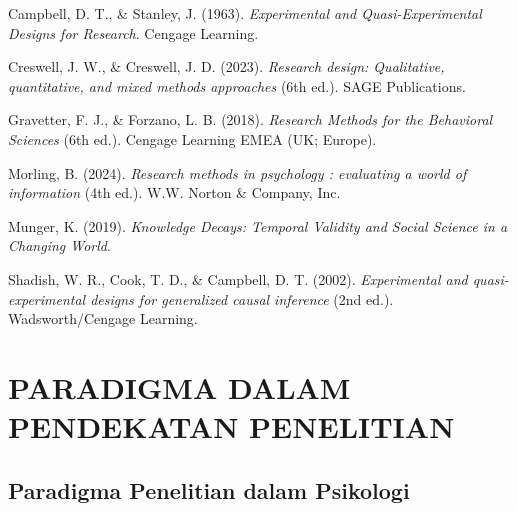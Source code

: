 \documentclass[
  indonesian,
  letterpaper,
  DIV=11,
  numbers=noendperiod]{scrreprt}
\newlength{\cslhangindent}
\newenvironment{CSLReferences}[2] %
 {\begin{list}{}{%
  \setlength{\itemindent}{0pt}
  \setlength{\leftmargin}{0pt}
  \setlength{\parsep}{0pt}
  \ifodd #1
   \setlength{\leftmargin}{\cslhangindent}
   \setlength{\itemindent}{-1\cslhangindent}
  \fi
  \setlength{\itemsep}{#2\baselineskip}}}
 {\end{list}}
\begin{document}
\label{refs--6}
\begin{CSLReferences}{1}{0}
Campbell, D. T., \& Stanley, J. (1963). \emph{Experimental and
Quasi-Experimental Designs for Research}. Cengage Learning.

Creswell, J. W., \& Creswell, J. D. (2023). \emph{Research design:
Qualitative, quantitative, and mixed methods approaches} (6th ed.). SAGE
Publications.

Gravetter, F. J., \& Forzano, L. B. (2018). \emph{Research Methods for
the Behavioral Sciences} (6th ed.). Cengage Learning EMEA (UK; Europe).

Morling, B. (2024). \emph{Research methods in psychology : evaluating a
world of information} (4th ed.). W.W. Norton \& Company, Inc.

Munger, K. (2019). \emph{Knowledge Decays: Temporal Validity and Social
Science in a Changing World}.

Shadish, W. R., Cook, T. D., \& Campbell, D. T. (2002).
\emph{Experimental and quasi-experimental designs for generalized causal
inference} (2nd ed.). Wadsworth/Cengage Learning.

\end{CSLReferences}

\part{PARADIGMA DALAM PENDEKATAN PENELITIAN}

\chapter{Paradigma Penelitian dalam
Psikologi}\label{paradigma-penelitian-dalam-psikologi}
\end{document}
